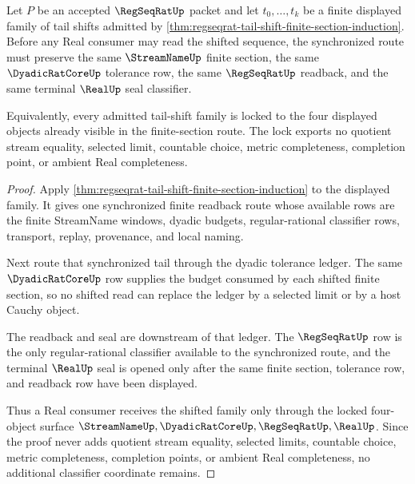 \begin{theorem}
\label{thm:regseqrat-tail-shift-real-seal-classifier-lock}
Let $P$ be an accepted $\RegSeqRatUp$ packet and let $t_0,\ldots,t_k$ be a finite displayed family of tail shifts admitted by \autoref{thm:regseqrat-tail-shift-finite-section-induction}. Before any Real consumer may read the shifted sequence, the synchronized route must preserve the same $\StreamNameUp$ finite section, the same $\DyadicRatCoreUp$ tolerance row, the same $\RegSeqRatUp$ readback, and the same terminal $\RealUp$ seal classifier.

Equivalently, every admitted tail-shift family is locked to the four displayed objects already visible in the finite-section route. The lock exports no quotient stream equality, selected limit, countable choice, metric completeness, completion point, or ambient Real completeness.
\end{theorem}
\begin{proof}
Apply \autoref{thm:regseqrat-tail-shift-finite-section-induction} to the displayed family. It gives one synchronized finite readback route whose available rows are the finite StreamName windows, dyadic budgets, regular-rational classifier rows, transport, replay, provenance, and local naming.

Next route that synchronized tail through the dyadic tolerance ledger. The same $\DyadicRatCoreUp$ row supplies the budget consumed by each shifted finite section, so no shifted read can replace the ledger by a selected limit or by a host Cauchy object.

The readback and seal are downstream of that ledger. The $\RegSeqRatUp$ row is the only regular-rational classifier available to the synchronized route, and the terminal $\RealUp$ seal is opened only after the same finite section, tolerance row, and readback row have been displayed.

Thus a Real consumer receives the shifted family only through the locked four-object surface $\StreamNameUp,\DyadicRatCoreUp,\RegSeqRatUp,\RealUp$. Since the proof never adds quotient stream equality, selected limits, countable choice, metric completeness, completion points, or ambient Real completeness, no additional classifier coordinate remains.
\end{proof}

